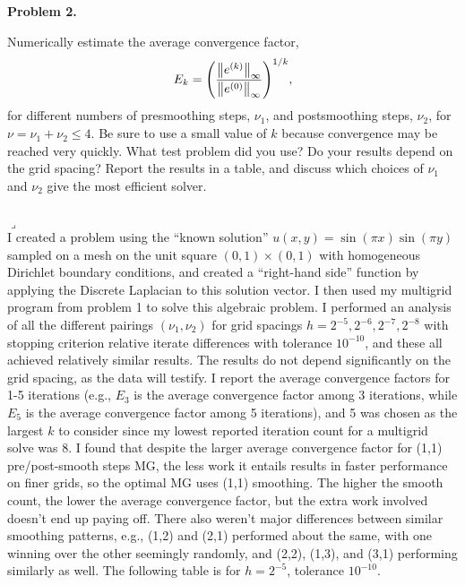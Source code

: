 \documentclass[12pt]{article}
\newenvironment{myprob}[1]
    {%
    \noindent{\Huge$\ulcorner$}\textbf{#1.}\begin{em}
    }
    { 
    \end{em} \\ \hphantom{l} \hfill {\Huge$\lrcorner$} }
\begin{document}
\newpage
\begin{myprob}{Problem 2}
Numerically estimate the average convergence factor,
$$ E_k = \qty(\dfrac{\norm{e^{(k)}}_\infty}{\norm{e^{(0)}}_\infty})^{1/k},$$
for different numbers of presmoothing steps, $\nu_1$, and postsmoothing steps, $\nu_2$, for $\nu = \nu_1 + \nu_2 \leq 4$. Be sure to use a small value of $k$ because convergence may be reached very quickly. What test problem did you use? Do your results depend on the grid spacing? Report the results in a table, and discuss which choices of $\nu_1$ and $\nu_2$ give the most efficient solver. \\
\end{myprob} \\
I created a problem using the ``known solution'' $u(x,y) = \sin(\pi x) \sin(\pi y)$
sampled on a mesh on the unit square $(0, 1)\times(0, 1)$ with homogeneous Dirichlet boundary conditions, and created a ``right-hand side'' function by applying the Discrete Laplacian to this solution vector.  I then used my multigrid program from problem 1 to solve this algebraic problem.
I performed an analysis of all the different pairings $(\nu_1, \nu_2)$ for grid spacings $h=2^{-5}, 2^{-6}, 2^{-7}, 2^{-8}$ with stopping criterion relative iterate differences with tolerance $10^{-10}$, and these all achieved relatively similar results. The results do not depend significantly on the grid spacing, as the data will testify. I report the average convergence factors for 1-5 iterations (e.g., $E_3$ is the average convergence factor among 3 iterations, while $E_5$ is the average convergence factor among 5 iterations), and 5 was chosen as the largest $k$ to consider since my lowest reported iteration count for a multigrid solve was 8. I found that despite the larger average convergence factor for (1,1) pre/post-smooth steps MG, the less work it entails results in faster performance on finer grids, so the optimal MG uses (1,1) smoothing.  The higher the smooth count, the lower the average convergence factor, but the extra work involved doesn't end up paying off.  There also weren't major differences between similar smoothing patterns, e.g., (1,2) and (2,1) performed about the same, with one winning over the other seemingly randomly, and (2,2), (1,3), and (3,1) performing similarly as well.
The following table is for $h=2^{-5}$, tolerance $10^{-10}$.\\
\end{document}
